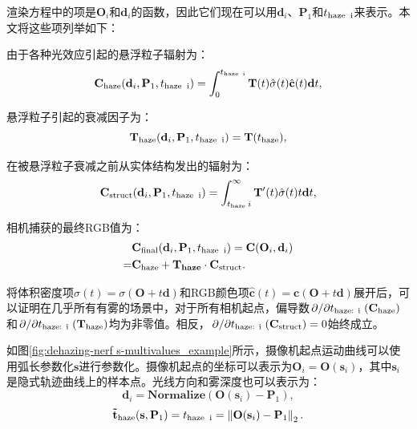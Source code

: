 渲染方程中的项是$\mathbf{O}_i$和$\mathbf{d}_i$的函数，因此它们现在可以用$\mathbf{d}_i$、$\mathbf{P}_1$和${t}_\text{haze\: i}$来表示。本文将这些项列举如下：

由于各种光效应引起的悬浮粒子辐射为：
\begin{equation}
    \mathbf{C_\text{haze}}(\mathbf{d}_i, \mathbf{P}_1, {t}_\text{haze\: i}) = \int_0^{{t}_\text{haze\: i}} \mathbf{T}(t)\hat{\sigma}(t)\hat{\mathbf{c}}(t)\mathbf{d}t,
\end{equation}

悬浮粒子引起的衰减因子为：
\begin{equation}
    \mathbf{T_\text{haze}}(\mathbf{d}_i, \mathbf{P}_1, {t}_\text{haze\: i}) = \mathbf{T}({t}_\text{haze}),
\end{equation}

在被悬浮粒子衰减之前从实体结构发出的辐射为：
\begin{equation}
    \mathbf{C_\text{struct}}(\mathbf{d}_i, \mathbf{P}_1, {t}_\text{haze\: i}) = \int_{{t}_\text{haze}\: i}^{\infty}\mathbf{T}'(t)\hat{\sigma}(t)t\mathbf{d}t,
\end{equation}

相机捕获的最终RGB值为：
\begin{equation}
\begin{split}
    &\mathbf{C_\text{final}}(\mathbf{d}_i, \mathbf{P}_1, {t}_\text{haze\: i}) = \mathbf{C}(\mathbf{O}_i, \mathbf{d}_i) \\
    = &\mathbf{C_\text{haze} + T_{haze} \cdot C_\text{struct}}. \label{eq:ObservedColor}
\end{split}
\end{equation}
\newcommand{\slfrac}[2]{\left.#1\middle/#2\right.}

将体积密度项$\hat{\sigma}(t) = \sigma(\mathbf{O} + t\mathbf{d})$和RGB颜色项$\hat{\mathbf{c}}(t) = \mathbf{c}(\mathbf{O} + t\mathbf{d})$展开后，可以证明在几乎所有有雾的场景中，对于所有相机起点，偏导数$\slfrac{\partial}{\partial {t}_\text{haze: i}}(\mathbf{C_\text{haze}})$和$\slfrac{\partial}{\partial {t}_\text{haze: i}}(\mathbf{T_\text{haze}})$均为非零值。相反，$\slfrac{\partial}{\partial {t}_\text{haze: i}}(\mathbf{C_\text{struct}})=0$始终成立。

如图\ref{fig:dehazing-nerf s-multivalues_example}所示，摄像机起点运动曲线可以使用弧长参数化$\mathbf{s}$进行参数化。摄像机起点的坐标可以表示为$\mathbf{O}_i = \mathbf{O}(\mathbf{s}_i)$，其中$\mathbf{s}_i$是隐式轨迹曲线上的样本点。光线方向和雾深度也可以表示为：
\begin{equation}
    \mathbf{d}_i = \mathbf{Normalize}(\mathbf{O}(\mathbf{s}_i) - \mathbf{P}_1), \label{eq:direction}
\end{equation}
\begin{equation}
    \mathbf{\tilde{t}_\text{haze}}(\mathbf{s}, \mathbf{P}_1) = t_\text{haze\: i} = \left\|\mathbf{O}(\mathbf{s}_i) - \mathbf{P}_1\right\|_2.
\end{equation}

